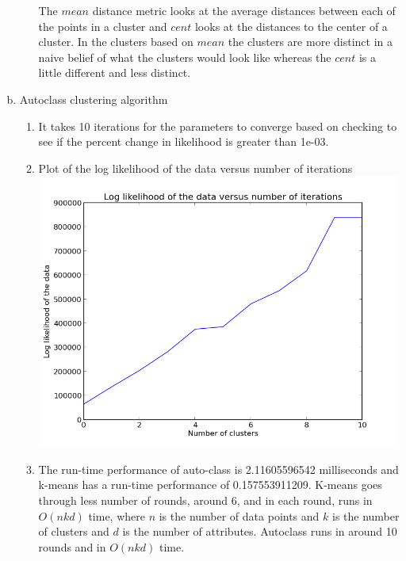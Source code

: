 \documentclass[11pt]{article}
\begin{document}
\begin{enumerate}[a.]
\begin{enumerate}
\begin{enumerate}
\begin{itemize}
	\end{itemize}
\end{enumerate}
The $mean$ distance metric looks at the average distances between each of the points in a cluster and $cent$ looks at the distances to the center of a cluster. In the clusters based on $mean$ the clusters are more distinct in a naive belief of what the clusters would look like whereas the $cent$ is a little different and less distinct.
\end{enumerate}

\item Autoclass clustering algorithm
\begin{enumerate}
\item It takes 10 iterations for the parameters to converge based on checking to see if the percent change in likelihood is greater than 1e-03.
\item Plot of the log likelihood of the data versus number of iterations\\
\includegraphics[width=120mm]{graphlogdraft5.png}
\item The run-time performance of auto-class is 2.11605596542 milliseconds and k-means has a run-time performance of 0.157553911209. K-means goes through less number of rounds, around 6, and in each round, runs in $O(nkd)$ time, where $n$ is the number of data points and $k$ is the number of clusters and $d$ is the number of attributes. Autoclass runs in around 10 rounds and in $O(nkd)$ time.
\end{enumerate}
\end{enumerate}
\end{document}
